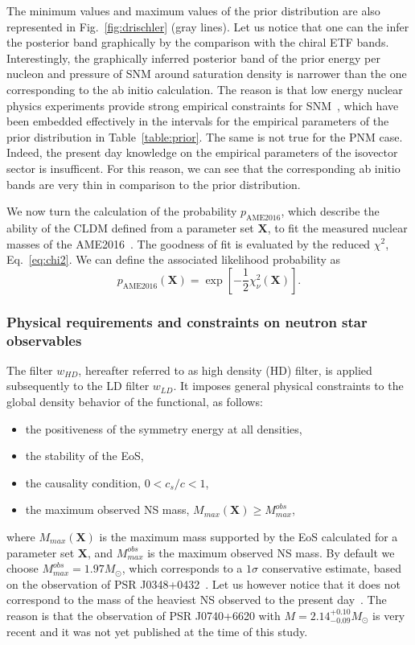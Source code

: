 The minimum values and maximum values of the prior distribution are also
represented in Fig.~\ref{fig:drischler} (gray lines). Let us notice that one 
can the infer the posterior band graphically by the comparison with the chiral 
ETF bands. Interestingly, the graphically inferred posterior band of the 
prior energy per nucleon and pressure of SNM around saturation density is 
narrower than the one corresponding to the ab initio calculation. The reason is
that low energy nuclear physics experiments provide strong empirical
constraints for SNM~\cite{Margueron2018a}, which have been embedded 
effectively in the intervals for the empirical parameters of the prior
distribution in Table~\ref{table:prior}. The same is not true for the PNM case. 
Indeed, the present day knowledge on the empirical parameters of the 
isovector sector is insufficent. For this reason, we can see that the 
corresponding ab initio bands are very thin in comparison to the prior 
distribution.

We now turn the calculation of the probability $p_{\text{AME2016}}$, which 
describe the ability of the CLDM defined from a parameter set $\bm{X}$, to fit 
the measured nuclear masses of the AME2016~\cite{Huang2017}. The goodness of 
fit is evaluated by the reduced $\chi^2$, Eq.~\ref{eq:chi2}. We can define the 
associated likelihood probability as
%
\begin{equation}
  p_{\text{AME2016}}(\bm{X}) = \exp\left[-\frac{1}{2}\chi_\nu^2(\bm{X})\right].
\end{equation}
%
 
\subsubsection{Physical requirements and constraints on neutron star 
observables}\label{subsubsec:hdconst}

The filter $w_{HD}$, hereafter referred to as high density (HD) filter, is
applied subsequently to the LD filter $w_{LD}$. It imposes general physical 
constraints to the global density behavior of the functional, as follows:
%
\begin{itemize}
  \item the positiveness of the symmetry energy at all densities,
  \item the stability of the EoS,
  \item the causality condition, $0 < c_s/c < 1$,
  \item the maximum observed NS mass, $M_{max}(\bm{X}) \geq M_{max}^{obs}$,
\end{itemize}
%
where $M_{max}(\bm{X})$ is the maximum mass supported by the EoS calculated for 
a parameter set $\bm{X}$, and $M_{max}^{obs}$ is the maximum observed NS mass. 
By default we choose $M_{max}^{obs} = 1.97M_\odot$, which corresponds to 
a $1\sigma$ conservative estimate, based on the observation of PSR 
J0348+0432~\cite{Antoniadis2013}. 
Let us however notice that it does not correspond to the mass of the heaviest 
NS observed to the present day~\cite{Cromartie2020}. The reason is that the
observation of PSR J0740+6620 with $M = 2.14_{-0.09}^{+0.10}M_\odot$ is very 
recent and it was not yet published at the time of this study.

